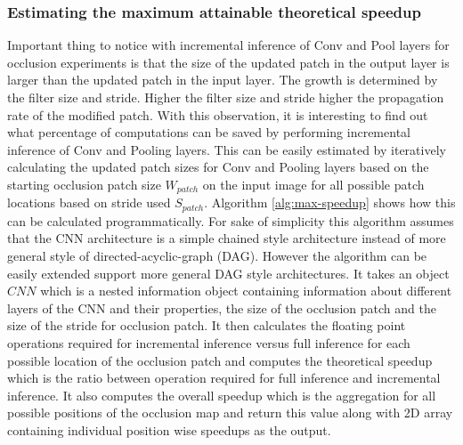 \subsubsection{Estimating the maximum attainable theoretical speedup}

Important thing to notice with incremental inference of Conv and Pool layers for occlusion experiments is that the size of the updated patch in the output layer is larger than the updated patch in the input layer.
The growth is determined by the filter size and stride. Higher the filter size and stride higher the propagation rate of the modified patch.
With this observation, it is interesting to find out what percentage of computations can be saved by performing incremental inference of Conv and Pooling layers.
This can be easily estimated by iteratively calculating the updated patch sizes for Conv and Pooling layers based on the starting occlusion patch size $W_{patch}$ on the input image for all possible patch locations based on stride used $S_{patch}$.
Algorithm \ref{alg:max-speedup} shows how this can be calculated programmatically.
For sake of simplicity this algorithm assumes that the CNN architecture is a simple chained style architecture instead of more general style of directed-acyclic-graph (DAG).
However the algorithm can be easily extended support more general DAG style architectures.
It takes an object $CNN$ which is a nested information object containing information about different layers of the CNN and their properties, the size of the occlusion patch and the size of the stride for occlusion patch.
It then calculates the floating point operations required for incremental inference versus full inference for each possible location of the occlusion patch and computes the theoretical speedup which is the ratio between operation required for full inference and incremental inference.
It also computes the overall speedup which is the aggregation for all possible positions of the occlusion map and return this value along with 2D array containing individual position wise speedups as the output.

